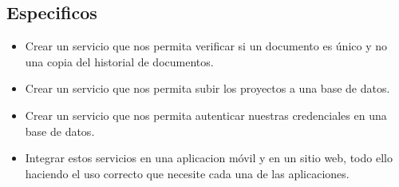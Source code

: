 \documentclass[%
 reprint,
 amsmath,amssymb,
 aps,
]{revtex4-1}
\begin{document}
\subsection {Especificos}
\begin{itemize}
\item Crear un servicio que nos permita verificar si un documento es único y no una copia del historial de documentos.
\item Crear un servicio que nos permita subir los proyectos a una base de datos.
\item Crear un servicio que nos permita autenticar nuestras credenciales en una base de datos.
\item Integrar estos servicios en una aplicacion móvil y en un sitio web, todo ello haciendo el uso correcto que necesite cada una de las aplicaciones.
\end{itemize}
\end{document}
